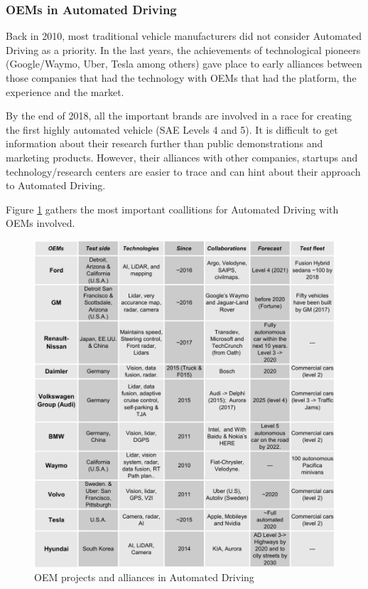 \subsubsection{OEMs in Automated Driving}
\label{sec:oem-ad}

Back in 2010, most traditional vehicle manufacturers did not consider Automated
Driving as a priority. In the last years, the achievements of technological 
pioneers (Google/Waymo, Uber, Tesla among others) gave place to early alliances
between those companies that had the technology with OEMs that had the
platform, the experience and the market.

By the end of 2018, all the important brands are involved in a race for creating
the first highly automated vehicle (SAE Levels 4 and 5). It is difficult to
get information about their research further than public demonstrations and
marketing products. However, their alliances with other companies, startups
and technology/research centers are easier to trace and can hint about their 
approach to Automated Driving.


Figure \ref{fig:oem-ad} gathers the most important coallitions for Automated
Driving with OEMs involved.



\begin{figure}[p]
    \centering
    \includegraphics[width=1.00\textwidth]{"img/OEM_jp_trim"}
    \caption{OEM projects and alliances in Automated Driving}
    \label{fig:oem-ad}
\end{figure}

